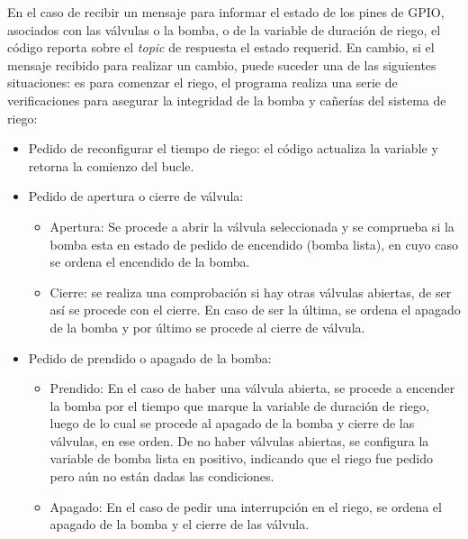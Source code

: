 En el caso de recibir un mensaje para informar el estado de los pines de GPIO, asociados con las válvulas o la bomba, o de la variable de duración de riego, el código reporta sobre el \textit{topic} de respuesta el estado requerid. En cambio, si el mensaje recibido para realizar un cambio, puede suceder una de las siguientes situaciones: es para comenzar el riego, el programa realiza una serie de verificaciones para asegurar la integridad de la bomba y cañerías del sistema de riego:
\begin{itemize}
\item Pedido de reconfigurar el tiempo de riego: el código actualiza la variable y retorna la comienzo del bucle.

\item Pedido de apertura o cierre de válvula:
    \begin{itemize}
    \item Apertura: Se procede a abrir la válvula seleccionada y se comprueba si la bomba esta en estado de pedido de encendido (bomba lista), en cuyo caso se ordena el encendido de la bomba.
    \item Cierre: se realiza una comprobación si hay otras válvulas abiertas, de ser así se procede con el cierre. En caso de ser la última, se ordena el apagado de la bomba y por último se procede al cierre de válvula.
    
    \end{itemize}

\item Pedido de prendido o apagado de la bomba:
    \begin{itemize}
    \item Prendido: En el caso de haber una válvula abierta, se procede a encender la bomba por el tiempo que marque la variable de duración de riego, luego de lo cual se procede al apagado de la bomba y cierre de las válvulas, en ese orden. De no haber válvulas abiertas, se configura la variable de bomba lista en positivo, indicando que el riego fue pedido pero aún no están dadas las condiciones.
    \item Apagado: En el caso de pedir una interrupción en el riego, se ordena el apagado de la bomba y el cierre de las válvula.
    
    \end{itemize}



\end{itemize}


